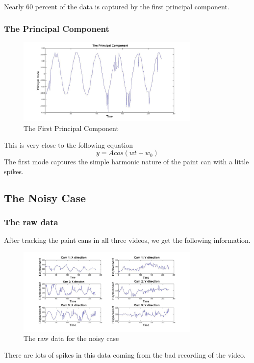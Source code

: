 \documentclass[a4paper]{article}
\begin{document}
Nearly 60 percent of the data is captured by the first principal component. 

\subsubsection{The Principal Component}
\begin{figure}[H] 
	\centering
	\includegraphics[width=0.8\textwidth]{PC1.jpg}
	
	\caption{The First Principal Component}	
\end{figure}
This is very close to the following equation
\[ y = A cos(wt+w_0)\]
The first mode captures the simple harmonic nature of the paint can with a little spikes.
\subsection{The Noisy Case}

\subsubsection{The raw data}
After tracking the paint cans in all three videos, we get the following information.

\begin{figure}[H] 
	\centering
	\includegraphics[width=0.8\textwidth]{rawdata2.jpg}
	\caption{The raw data for the noisy case}	
\end{figure}

There are lots of spikes in this data coming from the bad recording of the video.
\end{document}
